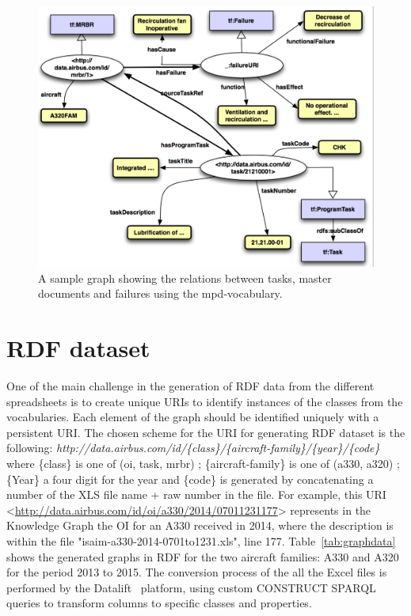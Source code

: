 \documentclass[runningheads,a4paper]{{llncs}}
\begin{document}
\begin{figure}[!htb]
\centering
\includegraphics[scale=0.60]{img/task-mpd-graph.png}
\caption{A sample graph showing the relations between tasks, master documents and failures using the mpd-vocabulary.}
\label{figtaskresource}
\end{figure}


\section{RDF dataset}
\label{sec:a330rdf}
One of the main challenge in the generation of RDF data from the different spreadsheets is to create unique URIs to identify instances of the classes from the vocabularies. Each element of the graph should be identified uniquely with a persistent URI. The chosen scheme for the URI for generating RDF dataset is the following:
\textit{http://data.airbus.com/id/\{class\}/\{aircraft-family\}/\{year\}/\{code\}} \\
where \{class\} is one of (oi, task, mrbr) ; \{aircraft-family\} is one of (a330, a320) ; \{Year\} a four digit for the year and \{code\} is generated by concatenating a number of the XLS file name + raw number in the file. For example, this URI <\url{http://data.airbus.com/id/oi/a330/2014/07011231177}> represents in the Knowledge Graph the OI for an A330 received in 2014, where the description is within the file "isaim-a330-2014-0701to1231.xls", line 177. Table~\ref{tab:graphdata} shows the generated graphs in RDF for the two aircraft families: A330 and A320 for the period 2013 to 2015. 
The conversion process of the all the Excel files is performed by the Datalift~\cite{scharffe2012} platform, using custom CONSTRUCT SPARQL queries to transform columns to specific classes and properties.  
\end{document}
